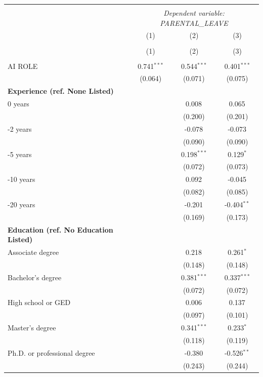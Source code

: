 \begin{table}[!htbp] \centering
\begin{tabular}{@{\extracolsep{5pt}}lccc}
\\[-1.8ex]\hline
\hline \\[-1.8ex]
& \multicolumn{3}{c}{\textit{Dependent variable: PARENTAL_LEAVE}} \
\cr \cline{2-4}
\\[-1.8ex] & \multicolumn{1}{c}{(1)} & \multicolumn{1}{c}{(2)} & \multicolumn{1}{c}{(3)}  \\
\\[-1.8ex] & (1) & (2) & (3) \\
\hline \\[-1.8ex]
 AI ROLE & 0.741$^{***}$ & 0.544$^{***}$ & 0.401$^{***}$ \\
& (0.064) & (0.071) & (0.075) \\
 \textbf{Experience (ref. None Listed)}\\
0 years & & 0.008$^{}$ & 0.065$^{}$ \\
& & (0.200) & (0.201) \\
 \quad 1-2 years & & -0.078$^{}$ & -0.073$^{}$ \\
& & (0.090) & (0.090) \\
 \quad 3-5 years & & 0.198$^{***}$ & 0.129$^{*}$ \\
& & (0.072) & (0.073) \\
 \quad 6-10 years & & 0.092$^{}$ & -0.045$^{}$ \\
& & (0.082) & (0.085) \\
 \quad 11-20 years & & -0.201$^{}$ & -0.404$^{**}$ \\
& & (0.169) & (0.173) \\
 \textbf{Education (ref. No Education Listed)}\\
Associate degree & & 0.218$^{}$ & 0.261$^{*}$ \\
& & (0.148) & (0.148) \\
 \quad Bachelor's degree & & 0.381$^{***}$ & 0.337$^{***}$ \\
& & (0.072) & (0.072) \\
 \quad High school or GED & & 0.006$^{}$ & 0.137$^{}$ \\
& & (0.097) & (0.101) \\
 \quad Master's degree & & 0.341$^{***}$ & 0.233$^{*}$ \\
& & (0.118) & (0.119) \\
 \quad Ph.D. or professional degree & & -0.380$^{}$ & -0.526$^{**}$ \\
& & (0.243) & (0.244) \\

\end{tabular}
\end{table}
